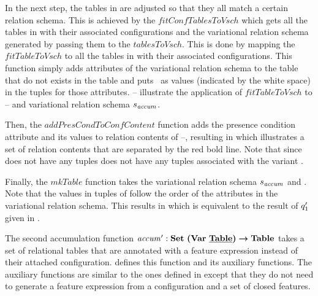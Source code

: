 \begin{example}
%
In the next step, the tables in  are adjusted so that they all match a certain
relation schema. This is achieved by the $\mathit{fitConfTablesToVsch}$ which gets all the 
tables in  with their associated configurations and the variational relation
schema generated by passing them to the $\mathit{tablesToVsch}$. This is done by
mapping the  $\mathit{fitTableToVsch}$ to all the tables in 
 with their associated configurations. This function simply adds
 attributes of the variational relation schema to the table that do not exists in the table 
 and puts \nul\ as values (indicated by the white space) in the tuples for those attributes. 
%
-- illustrate the application of 
$\mathit{fitTableToVsch}$ to -- and variational relation 
schema $\vRelSch_{\mathit{accum}}$.
%



%
Then, the $\mathit{addPresCondToConfContent}$ 
function adds the presence condition attribute and its values 
to relation contents of --, resulting in  which illustrates a set of 
relation contents that are separated by the red bold line. Note that since 
does not have any tuples  does not have any tuples associated with
the variant \setDef \vThree.
%

%
Finally, the $\mathit{mkTable}$ function takes the variational relation schema $\vRelSch_{\mathit{accum}}$
and . Note that the values in tuples of  follow the order of the
attributes in the variational relation schema. This results in  which is equivalent to
the result of $\VVal \vQ_1$ given in .
%

\end{example}

The second accumulation function
 $\VVal {\mathit{accum}} :  \settype {\bm{(}\vartype \pTabSet\bm{)}} \totype \tabletype$ 
 takes a set of relational tables that are annotated with
a feature expression instead of their attached configuration.  defines
this function and its auxiliary functions. The auxiliary functions are similar to the ones
defined in  except that they do not need to generate a feature expression
from a configuration and a set of closed features.
%



